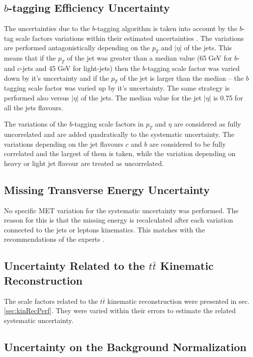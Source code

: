 \subsection{$b$-tagging Efficiency Uncertainty}

The uncertainties due to the $b$-tagging algorithm is taken into account by the $b$-tag scale factors variations within their estimated
uncertainties \cite{CMS-PAS-BTV-13-001}. The variations are performed antagonistically depending on the $p_{T}$ and $|\eta|$ of the jets.
This means that if the $p_{T}$ of the jet was greater than a median value (65$\;$GeV for $b$- and $c$-jets and 45$\;$GeV for light-jets) then 
the $b$-tagging scale factor was varied down by it's uncertainty and if the $p_{T}$ of the jet is larger than the median -- the $b$tagging 
scale factor was varied up by it's uncertainty. The same strategy is performed also versus $|\eta|$
of the jets. The median value for the jet $|\eta|$ is 0.75 for all the jets flavours.

The variations of the $b$-tagging scale factors in $p_{T}$ and $\eta$ are considered as fully uncorrelated and are added
quadratically to the systematic uncertainty. The variations depending on the jet flavours $c$ and $b$ are considered to be 
fully correlated and the largest of them is taken, while the variation depending on heavy or light jet flavour are treated as uncorrelated.

\subsection{Missing Transverse Energy Uncertainty}

No specific MET variation for the systematic uncertainty was performed. The reason for this is that the missing energy is recalculated
after each variation connected to the jets or leptons kinematics. This matches with the recommendations of the experts \cite{CMS-PAS-JME-12-002}.

\subsection{Uncertainty Related to the $t\bar{t}$ Kinematic Reconstruction}

The scale factors related to the $t\bar{t}$ kinematic reconstruction were presented in sec. \ref{sec:kinRecPerf}. They were varied 
within their errors to estimate the related systematic uncertainty.

\subsection{Uncertainty on the Background Normalization}


